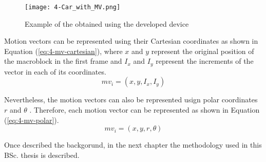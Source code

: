 \begin{figure}[!h]
	\begin{center}
		\texttt{[image: 4-Car\_with\_MV.png]}
		\caption{Example of  the  obtained using the developed device}
		\label{fig:4-Car_with_MV}
	\end{center}
\end{figure}

Motion vectors can be represented using their Cartesian coordinates as shown in Equation (\ref{eq:4-mv-cartesian}), where $x$ and $y$ represent the original position of the macroblock in the first frame and $I_{x}$ and $I_{y}$ represent the increments of the vector in each of its coordinates.
\begin{equation} \label{eq:4-mv-cartesian}
mv_{i} = (x, y, I_{x}, I_{y})
\end{equation}

\newpage
Nevertheless, the motion vectors can also be represented usign polar coordinates $r$ and $\theta$ \cite{GRMSJ12}. Therefore, each motion vector can be represented as shown in Equation (\ref{eq:4-mv-polar}).
\begin{equation} \label{eq:4-mv-polar}
mv_{i} = (x, y, r, \theta)
\end{equation} 

Once described the backgorund, in the next chapter the methodology used in this \ac{BSc.} thesis is described.



